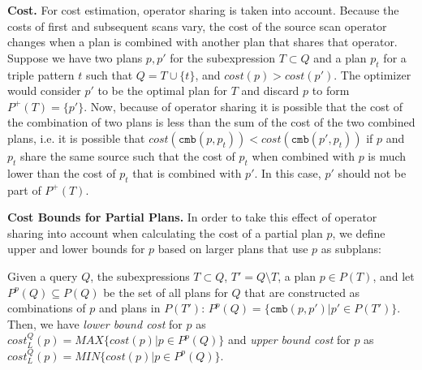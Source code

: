 \textbf{Cost.} For cost estimation, operator sharing is taken into
account. Because the costs of first and subsequent scans vary, the
cost of the source scan operator changes when a plan is combined with
another plan that shares that operator.
Suppose we have two plans $p,p'$ for the subexpression $T \subset Q$
and a plan $p_t$ for a triple pattern $t$ such that $Q = T \cup
\{t\}$, and $cost(p) > cost(p')$. The optimizer would consider $p'$ to
be the optimal plan for $T$ and discard $p$ to form
$P^+(T)=\{p'\}$. Now, because of operator sharing it is possible that
the cost of the combination of two plans is less than the sum of the
cost of the two combined plans, i.e. it is possible that
$cost(\mathtt{cmb}(p,p_t)) < cost(\mathtt{cmb}(p',p_t))$ if $p$ and
$p_t$ share the same source such that the cost of $p_t$ when combined
with $p$ is much lower than the cost of $p_t$ that is combined with
$p'$. In this case, $p'$ should not be part of $P^+(T)$.


\textbf{Cost Bounds for Partial Plans.} In order to take this effect
of operator sharing into account when calculating the cost of a
partial plan $p$, we define upper and lower bounds for $p$ based on
larger plans that use $p$ as subplans:

\begin{definition}
  \label{def:bounds}
  Given a query $Q$, the subexpressions $T \subset Q$, $T' = Q
  \setminus T$, a plan $p \in P(T)$, and let $P^p(Q) \subseteq P(Q)$
  be the set of all plans for $Q$ that are constructed as combinations
  of $p$ and plans in $P(T')$: $P^p(Q) = \{\mathtt{cmb}(p,p') | p' \in
  P(T')\}$.  Then, we have \emph{lower bound cost} for $p$ as
  $cost_L^Q(p)= MAX\{cost(p)| p \in P^p(Q)\}$ and \emph{upper bound
    cost} for $p$ as $cost_L^Q(p)= MIN\{cost(p)| p \in P^p(Q)\}$.
\end{definition}


